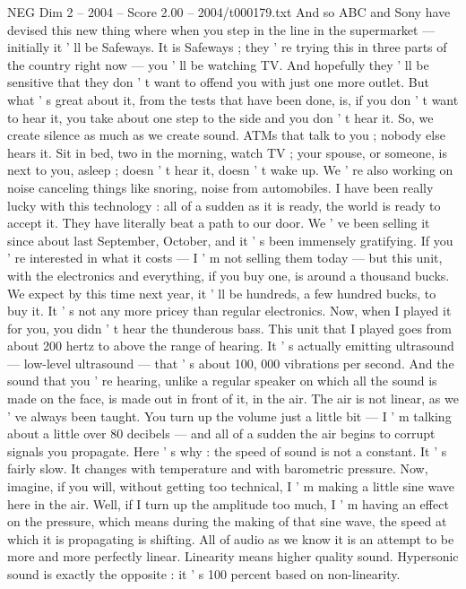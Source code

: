 \begin{textsample}{NEG Dim 2 – 2004 – Score 2.00 – 2004/t000179.txt}
And so ABC and Sony have devised this new thing where when you step in the line in the supermarket — initially it ' ll be Safeways.
It is Safeways ; they ' re trying this in three parts of the country right now — you ' ll be watching TV.
And hopefully they ' ll be sensitive that they don ' t want to offend you with just one more outlet.
But what ' s great about it, from the tests that have been done, is, if you don ' t want to hear it, you take about one step to the side and you don ' t hear it.
So, we create silence as much as we create sound.
ATMs that talk to you ; nobody else hears it.
Sit in bed, two in the morning, watch TV ; your spouse, or someone, is next to you, asleep ; doesn ' t hear it, doesn ' t wake up.
We ' re also working on noise canceling things like snoring, noise from automobiles.
I have been really lucky with this technology : all of a sudden as it is ready, the world is ready to accept it.
They have literally beat a path to our door.
We ' ve been selling it since about last September, October, and it ' s been immensely gratifying.
If you ' re interested in what it costs — I ' m not selling them today — but this unit, with the electronics and everything, if you buy one, is around a thousand bucks.
We expect by this time next year, it ' ll be hundreds, a few hundred bucks, to buy it.
It ' s not any more pricey than regular electronics.
Now, when I played it for you, you didn ' t hear the thunderous bass.
This unit that I played goes from about 200 hertz to above the range of hearing.
It ' s actually emitting ultrasound — low-level ultrasound — that ' s about 100, 000 vibrations per second.
And the sound that you ' re hearing, unlike a regular speaker on which all the sound is made on the face, is made out in front of it, in the air.
The air is not linear, as we ' ve always been taught.
You turn up the volume just a little bit — I ' m talking about a little over 80 decibels — and all of a sudden the air begins to corrupt signals you propagate.
Here ' s why : the speed of sound is not a constant.
It ' s fairly slow.
It changes with temperature and with barometric pressure.
Now, imagine, if you will, without getting too technical, I ' m making a little sine wave here in the air.
Well, if I turn up the amplitude too much, I ' m having an effect on the pressure, which means during the making of that sine wave, the speed at which it is propagating is shifting.
All of audio as we know it is an attempt to be more and more perfectly linear.
Linearity means higher quality sound.
Hypersonic sound is exactly the opposite : it ' s 100 percent based on non-linearity.

\end{textsample}
